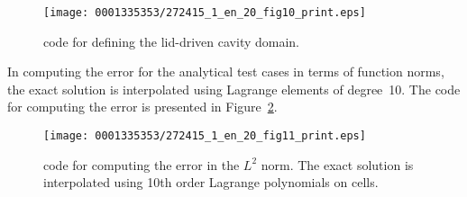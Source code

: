 \begin{figure}[!p]
\bwfig
\texttt{[image: 0001335353/272415\_1\_en\_20\_fig10\_print.eps]}
\caption{\dolfin{} code for defining the lid-driven cavity domain.}
\label{code:terrel:domain:lid}\vspace*{2pc}
\end{figure}

In computing the error for the analytical test cases in terms of
function norms, the exact solution is interpolated using Lagrange
elements of degree~10. The code for computing the error is presented
in Figure~\ref{code:terrel:error}.

\begin{figure}[!t]
\bwfig
\texttt{[image: 0001335353/272415\_1\_en\_20\_fig11\_print.eps]}
\caption{\dolfin{} code for computing the error in the $L^{2}$ norm. The
exact solution is interpolated using 10th order Lagrange polynomials
on cells.}\label{code:terrel:error}\vspace*{10pt}
\end{figure}
